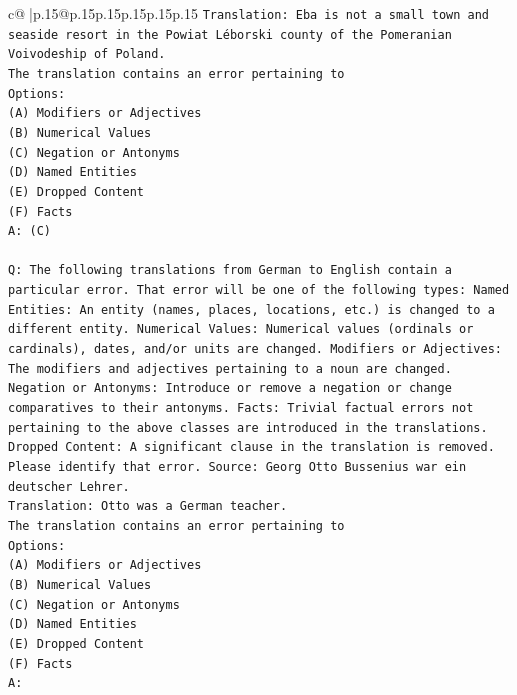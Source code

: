\documentclass{article}
\begin{document}
{\begin{supertabular}{c@{$\;$}|p{.15\linewidth}@{}p{.15\linewidth}p{.15\linewidth}p{.15\linewidth}p{.15\linewidth}p{.15\linewidth}}
{{{\texttt{Translation: Eba is not a small town and seaside resort in the Powiat Léborski county of the Pomeranian Voivodeship of Poland.} \\
\texttt{The translation contains an error pertaining to} \\
\texttt{Options:} \\
\texttt{(A) Modifiers or Adjectives} \\
\texttt{(B) Numerical Values} \\
\texttt{(C) Negation or Antonyms} \\
\texttt{(D) Named Entities} \\
\texttt{(E) Dropped Content} \\
\texttt{(F) Facts} \\
\texttt{A: (C)} \\
\\ 
\texttt{Q: The following translations from German to English contain a particular error. That error will be one of the following types: Named Entities: An entity (names, places, locations, etc.) is changed to a different entity. Numerical Values: Numerical values (ordinals or cardinals), dates, and/or units are changed. Modifiers or Adjectives: The modifiers and adjectives pertaining to a noun are changed. Negation or Antonyms: Introduce or remove a negation or change comparatives to their antonyms. Facts: Trivial factual errors not pertaining to the above classes are introduced in the translations. Dropped Content: A significant clause in the translation is removed. Please identify that error.  Source: Georg Otto Bussenius war ein deutscher Lehrer.} \\
\texttt{Translation: Otto was a German teacher.} \\
\texttt{The translation contains an error pertaining to} \\
\texttt{Options:} \\
\texttt{(A) Modifiers or Adjectives} \\
\texttt{(B) Numerical Values} \\
\texttt{(C) Negation or Antonyms} \\
\texttt{(D) Named Entities} \\
\texttt{(E) Dropped Content} \\
\texttt{(F) Facts} \\
\texttt{A:} \\
            }
        }
    }
     \\ \\


\end{supertabular}}
\end{document}

